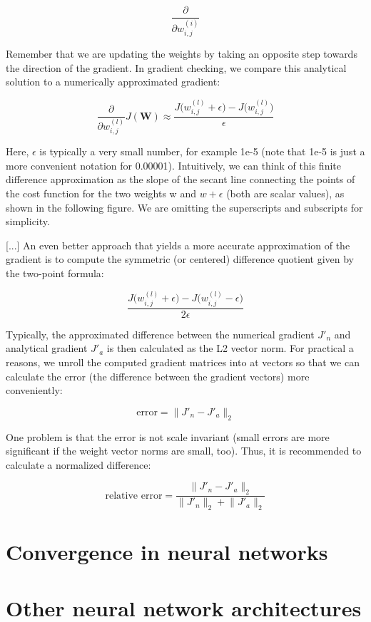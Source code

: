 \documentclass[letterpaper]{report}
\begin{document}
\[
\frac{\partial}{\partial w_{i, j}^{(i)}}
\]

Remember that we are updating the weights by taking an opposite step towards the direction of the gradient. In gradient checking, we compare this analytical solution to a numerically approximated gradient:

\[
\frac{\partial}{\partial w_{i, j}^{(l)}} J(\mathbf{W}) \approx \frac{J\big( w_{i, j}^{(l)} + \epsilon \big) - J \big( w_{i, j}^{(l)}\big)}{\epsilon}
\]

Here, $\epsilon$ is typically a very small number, for example 1e-5 (note that 1e-5 is just
a more convenient notation for 0.00001). Intuitively, we can think of this finite difference approximation as the slope of the secant line connecting the points of the cost function for the two weights w and $w + \epsilon$ (both are scalar values), as shown in the following  figure. We are omitting the superscripts and subscripts for simplicity.

[...] An even better approach that yields a more accurate approximation of the gradient is to compute the symmetric (or centered) difference quotient given by the two-point formula:

\[
\frac{ J\big( w_{i, j}^{(l)} + \epsilon \big) - J\big( w_{i, j}^{(l)} - \epsilon \big)  }{2 \epsilon}
\]

Typically, the approximated difference between the numerical gradient $J'_{n}$ and analytical gradient $J'_{a}$ is then calculated as the L2 vector norm. For practical a reasons, we unroll the computed gradient matrices into  at vectors so that we can calculate the error (the difference between the gradient vectors) more conveniently:

\[
\text{error} = \lVert  J'_n - J'_a  \rVert_2
\]

One problem is that the error is not scale invariant (small errors are more significant if the weight vector norms are small, too). Thus, it is recommended to calculate a normalized difference:

\[
\text{relative error} = \frac{\lVert J'_n - J'_a \rVert_2}{\lVert J'_n \rVert_2 +  \lVert J'_a \rVert_2 }
\]


\section{Convergence in neural networks}
\section{Other neural network architectures}
\end{document}
